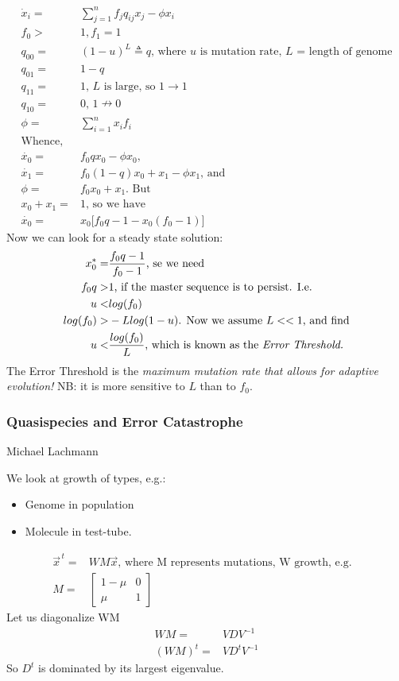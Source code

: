 \documentclass[]{article}
\begin{document}
\begin{align*}
\dot x_i =& \sum_{j=1}^{n} f_j q_{ij}x_j - \phi x_i\\
f_0 >&1, f_1 = 1\\
q_{00} =& (1-u)^L \triangleq q\text{, where $u$ is mutation rate, $L$ = length of genome}\\
q_{01} =& 1-q\\
q_{11} =& 1\text{, $L$ is large, so 1$\rightarrow$1} \\
q_{10} =& 0\text{, $1\nrightarrow0$}\\
\phi =& \sum_{i=1}^{n}x_i f_i\\
\text{Whence,}\\
\dot{x_0}=&f_0 q x_0 - \phi x_0\text{,}\\
\dot{x_1}=&f_0 (1-q) x_0 + x_1 -\phi x_1\text{, and}\\
\phi =& f_0 x_0 + x_1 \text{. But} \\
x_0 + x_1 =& 1\text{, so we have}\\
\dot{x_0}=& x_0 \big[f_0 q -1 - x_0 (f_0 - 1)\big]
\end{align*}
Now we can look for a steady state solution:
\begin{align*}
x_0^* =& \frac{f_0 q - 1}{f_0 - 1}\text{, se we need}\\
f_0q >& 1 \text{, if the master sequence is to persist. I.e.}\\
u <& log(f_0)\\
log(f_0) >& -L log(1-u)\text{. Now we assume $L<<1$, and find}\\
u <& \frac{log(f_0)}{L}\text{, which is known as the \emph{Error Threshold.}} 
\end{align*}
The Error Threshold is the \emph{maximum mutation rate that allows for adaptive evolution!} NB: it is more sensitive to $L$ than to $f_0$.

\subsubsection{Quasispecies and Error Catastrophe}

Michael Lachmann

We look at growth of types, e.g.:
\begin{itemize}
	\item Genome in population
	\item Molecule in test-tube.
\end{itemize}

\begin{align*}
\vec{x}^{\,t} =& W M \vec{x}\text{, where M represents mutations, W growth, e.g.}\\
M =& \begin{bmatrix}
1-\mu & 0\\
\mu& 1
\end{bmatrix}&
\end{align*}
Let us diagonalize WM
\begin{align*}
WM =& VDV^{-1}\\
(WM)^t =& V D^t V^{-1}
\end{align*}
So $D^t$ is dominated by its largest eigenvalue.
\end{document}
